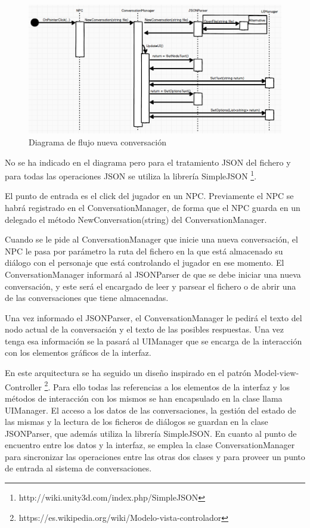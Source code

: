\begin{figure}[H]
\begin{center}
\includegraphics[scale=0.55]{imagenes/nuevaConversFlujo.png}
\caption{Diagrama de flujo nueva conversación}
\label{nuevaConversFlujo}
\end{center}
\end{figure}

No se ha indicado en el diagrama pero para el tratamiento JSON del fichero y para todas las operaciones JSON se utiliza la librería SimpleJSON \footnote{http://wiki.unity3d.com/index.php/SimpleJSON}.


El punto de entrada es el click del jugador en un NPC. Previamente el NPC se habrá registrado en el ConversationManager, de forma que el NPC guarda en un delegado el método NewConversation(string) del ConversationManager.

Cuando se le pide al ConversationManager que inicie una nueva conversación, el NPC le pasa por parámetro la ruta del fichero en la que está almacenado su diálogo con el personaje que está controlando el jugador en ese momento. El ConversationManager informará al JSONParser de que se debe iniciar una nueva conversación, y este será el encargado de leer y parsear el fichero o de abrir una de las conversaciones que tiene almacenadas.

Una vez informado el JSONParser, el ConversationManager le pedirá el texto del nodo actual de la conversación y el texto de las posibles respuestas. Una vez tenga esa información se la pasará al UIManager que se encarga de la interacción con los elementos gráficos de la interfaz.

En este arquitectura se ha seguido un diseño inspirado en el patrón Model-view-Controller \footnote{https://es.wikipedia.org/wiki/Modelo-vista-controlador}. Para ello todas las referencias a los elementos de la interfaz y los métodos de interacción con los mismos se han encapsulado en la clase llama UIManager. El acceso a los datos de las conversaciones, la gestión del estado de las mismas y la lectura de los ficheros de diálogos se guardan en la clase JSONParser, que además utiliza la librería SimpleJSON. En cuanto al punto de encuentro entre los datos y la interfaz, se emplea la clase ConversationManager para sincronizar las operaciones entre las otras dos clases y para proveer un punto de entrada al sistema de conversaciones.

